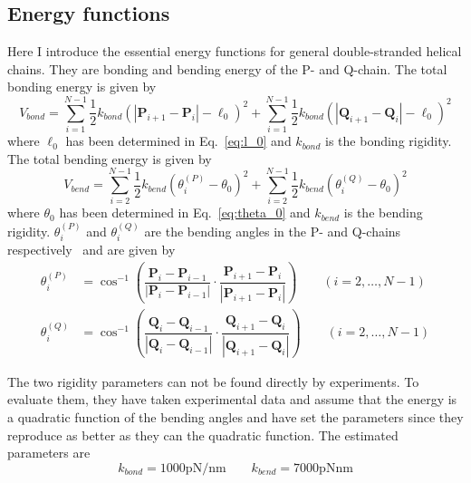 \documentclass[a4paper,10pt]{article}
\begin{document}
\subsection{Energy functions}
Here I introduce the essential energy functions for general double-stranded helical chains.
They are bonding and bending energy of the P- and Q-chain.
The total bonding energy is given by
\begin{equation}\label{eq:bond}
V_{bond}=\sum_{i=1}^{N-1}\dfrac{1}{2}k_{bond}\left(\left|\textbf{P}_{i+1}-\textbf{P}_{i}\right|-\ell_0\right)^2+\sum_{i=1}^{N-1}\dfrac{1}{2}k_{bond}\left(\left|\textbf{Q}_{i+1}-\textbf{Q}_{i}\right|-\ell_0\right)^2
\end{equation}
where $\ell_0$ has been determined in Eq.~\ref{eq:l_0} and $k_{bond}$ is the bonding rigidity.
The total bending energy is given by
\begin{equation}\label{eq:bend}
V_{bend}=\sum_{i=2}^{N-1}\dfrac{1}{2}k_{bend}\left(\theta_i^{(P)}-\theta_0\right)^2+\sum_{i=2}^{N-1}\dfrac{1}{2}k_{bend}\left(\theta_i^{(Q)}-\theta_0\right)^2
\end{equation}
where $\theta_0$ has been determined in Eq.~\ref{eq:theta_0} and $k_{bend}$ is the bending rigidity.
$\theta_i^{(P)}$ and $\theta_i^{(Q)}$ are the bending angles in the P- and Q-chains respectively~\cite{old} and are given by
\begin{equation}
\begin{split}
\theta_i^{(P)} & =\cos^{-1}\left(\dfrac{\textbf{P}_{i}-\textbf{P}_{i-1}}{\left|\textbf{P}_{i}-\textbf{P}_{i-1}\right|}\cdot\dfrac{\textbf{P}_{i+1}-\textbf{P}_{i}}{\left|\textbf{P}_{i+1}-\textbf{P}_{i}\right|}\right)\qquad \left(i=2,\dots,N-1\right) \\
\theta_i^{(Q)} & =\cos^{-1}\left(\dfrac{\textbf{Q}_{i}-\textbf{Q}_{i-1}}{\left|\textbf{Q}_{i}-\textbf{Q}_{i-1}\right|}\cdot\dfrac{\textbf{Q}_{i+1}-\textbf{Q}_{i}}{\left|\textbf{Q}_{i+1}-\textbf{Q}_{i}\right|}\right)\qquad \left(i=2,\dots,N-1\right)
\end{split}
\end{equation}

The two rigidity parameters can not be found directly by experiments.
To evaluate them, they have taken experimental data and assume that the energy is a quadratic function of the bending angles and have set the parameters since they reproduce as better as they can the quadratic function.
The estimated parameters are
\begin{equation}
k_{bond}=1000\text{pN/nm}\qquad k_{bend}=7000\text{pNnm}
\end{equation}
\end{document}
